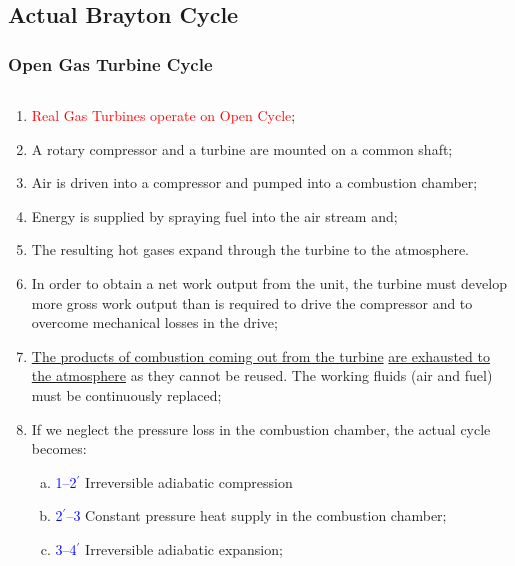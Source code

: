 \documentclass[10pt,compress]{beamer}
\newcommand{\red}{\textcolor{red}}
\newcommand{\blue}{\textcolor{blue}}
\begin{document}
\subsection{Actual Brayton Cycle}

\begin{frame}
 \frametitle{Open Gas Turbine Cycle}
 \begin{columns}
  \begin{column}[c]{0.6\linewidth} 
    \begin{enumerate}[(1)]\scriptsize
      \item<1-> \red{Real Gas Turbines operate on Open Cycle};
      \item<2-> A rotary compressor and a turbine are mounted on a common shaft;
      \item<2-> Air is driven into a compressor and pumped into a combustion chamber;
      \item<2-> Energy is supplied by spraying fuel into the air stream and;
      \item<2-> The resulting hot gases expand through the turbine to the atmosphere.
      \item<3-> In order to obtain a net work output from the unit, the turbine must develop more gross work output than is required to drive the compressor and to overcome mechanical losses in the drive;
      \item<3-> \underline{The products of combustion coming out from the turbine} \underline{are exhausted to the atmosphere} as they cannot be reused. The working fluids (air and fuel) must be continuously replaced;
      \item<4-> If we neglect the pressure loss in the combustion chamber, the actual cycle becomes:
         \begin{enumerate}[(a)]\scriptsize
             \item<4-> \blue{1--2$^{\prime}$} Irreversible adiabatic compression
             \item<4-> \blue{2$^{\prime}$--3} Constant pressure heat supply in the combustion chamber;
             \item<4-> \blue{3--4$^{\prime}$} Irreversible adiabatic expansion;
        \end{enumerate}

\end{enumerate}
\end{column}
\end{columns}
\end{frame}
\end{document}
